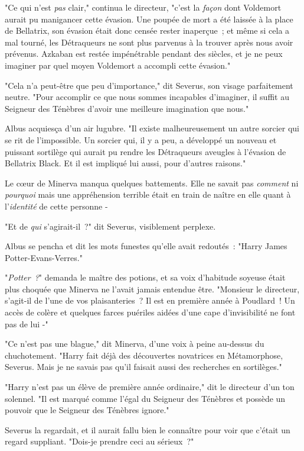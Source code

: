 "Ce qui n'est \emph{pas} clair," continua le directeur, "c'est la \emph{façon} dont Voldemort aurait pu manigancer cette évasion. Une poupée de mort a été laissée à la place de Bellatrix, son évasion était donc censée rester inaperçue~; et même si cela a mal tourné, les Détraqueurs ne sont plus parvenus à la trouver après nous avoir prévenus. Azkaban est restée impénétrable pendant des siècles, et je ne peux imaginer par quel moyen Voldemort a accompli cette évasion."

"Cela n'a peut-être que peu d'importance," dit Severus, son visage parfaitement neutre. "Pour accomplir ce que nous sommes incapables d'imaginer, il suffit au Seigneur des Ténèbres d'avoir une meilleure imagination que nous."

Albus acquiesça d'un air lugubre. "Il existe malheureusement un autre sorcier qui se rit de l'impossible. Un sorcier qui, il y a peu, a développé un nouveau et puissant sortilège qui aurait pu rendre les Détraqueurs aveugles à l'évasion de Bellatrix Black. Et il est impliqué lui aussi, pour d'autres raisons."

Le cœur de Minerva manqua quelques battements. Elle ne savait pas \emph{comment} ni \emph{pourquoi} mais une appréhension terrible était en train de naître en elle quant à l'\emph{identité} de cette personne -

"Et de \emph{qui} s'agirait-il~?" dit Severus, visiblement perplexe.

Albus se pencha et dit les mots funestes qu'elle avait redoutés~: "Harry James Potter-Evans-Verres."

"\emph{Potter~?}" demanda le maître des potions, et sa voix d'habitude soyeuse était plus choquée que Minerva ne l'avait jamais entendue être. "Monsieur le directeur, s'agit-il de l'une de vos plaisanteries~? Il est en première année à Poudlard~! Un accès de colère et quelques farces puériles aidées d'une cape d'invisibilité ne font pas de lui -"

"Ce n'est pas une blague," dit Minerva, d'une voix à peine au-dessus du chuchotement. "Harry fait déjà des découvertes novatrices en Métamorphose, Severus. Mais je ne savais pas qu'il faisait aussi des recherches en sortilèges."

"Harry n'est pas un élève de première année ordinaire," dit le directeur d'un ton solennel. "Il est marqué comme l'égal du Seigneur des Ténèbres et possède un pouvoir que le Seigneur des Ténèbres ignore."

Severus la regardait, et il aurait fallu bien le connaître pour voir que c'était un regard suppliant. "Dois-je prendre ceci au sérieux~?"

